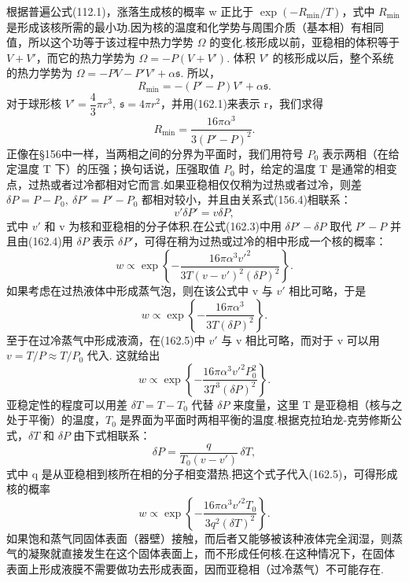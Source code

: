 根据普遍公式(112.1)，涨落生成核的概率 w 正比于 $\exp\left(-R_{\mathrm{min}}/T\right)$，式中 $R_{\mathrm{min}}$ 是形成该核所需的最小功.因为核的温度和化学势与周围介质（基本相）有相同值，所以这个功等于该过程中热力学势 $\Omega$ 的变化.核形成以前，亚稳相的体积等于 $V+V'$，而它的热力学势为 $\Omega=-P(V+V')$. 体积 $V'$ 的核形成以后，整个系统的热力学势为 $\Omega=-PV-P'V'+\alpha\mathfrak{s}$. 所以，
\begin{equation}
  R_{\mathrm{min}}=-(P'-P)V'+\alpha\mathfrak{s}.
\end{equation}
对于球形核 $V'=\dfrac{4}{3}\pi r^3,\ \mathfrak{s}=4\pi r^2$，并用(162.1)来表示 r，我们求得
\begin{equation}
  R_{\mathrm{min}}=\frac{16\pi\alpha^3}{3(P'-P)^2}.
\end{equation}
正像在§156中一样，当两相之间的分界为平面时，我们用符号 $P_0$ 表示两相（在给定温度 T 下）的压强；换句话说，压强取值 $P_0$ 时，给定的温度 T 是通常的相变点，过热或者过冷都相对它而言.如果亚稳相仅仅稍为过热或者过冷，则差 $\delta P=P-P_0,\ \delta P'=P'-P_0$ 都相对较小，并且由关系式(156.4)相联系：
\begin{equation}
  v'\delta P'=v\delta P,
\end{equation}
式中 $v'$ 和 v 为核和亚稳相的分子体积.在公式(162.3)中用 $\delta P'-\delta P$ 取代 $P'-P$ 并且由(162.4)用 $\delta P$ 表示 $\delta P'$，可得在稍为过热或过冷的相中形成一个核的概率：
\begin{equation}
  w\propto\exp\left\{-\frac{16\pi\alpha^3v'^2}
  {3T(v-v')^2(\delta P)^2}\right\}.
\end{equation}
如果考虑在过热液体中形成蒸气泡，则在该公式中 v 与 $v'$ 相比可略，于是
\begin{equation}
  w\propto\exp\left\{-\frac{16\pi\alpha^3}{3T(\delta P)^2}\right\}.
\end{equation}
至于在过冷蒸气中形成液滴，在(162.5)中 $v'$ 与 v 相比可略，而对于 v 可以用 $v=T/P\approx T/P_0$ 代入. 这就给出
\begin{equation}
  w\propto\exp\left\{-\frac{16\pi\alpha^3v'^2P_0^2}
  {3T^3(\delta P)^2}\right\}.
\end{equation}
亚稳定性的程度可以用差 $\delta T=T-T_0$ 代替 $\delta P$ 来度量，这里 T 是亚稳相（核与之处于平衡）的温度，$T_0$ 是界面为平面时两相平衡的温度.根据克拉珀龙-克劳修斯公式，$\delta T$ 和 $\delta P$ 由下式相联系：
\begin{equation*}
  \delta P=\frac{q}{T_0(v-v')}\,\delta T,
\end{equation*}
式中 q 是从亚稳相到核所在相的分子相变潜热.把这个式子代入(162.5)，可得形成核的概率
\begin{equation}
  w\propto\exp\left\{-\frac{16\pi\alpha^3v'^2T_0}
  {3q^2(\delta T)^2}\right\}.
\end{equation}
如果饱和蒸气同固体表面（器壁）接触，而后者又能够被该种液体完全润湿，则蒸气的凝聚就直接发生在这个固体表面上，而不形成任何核.在这种情况下，在固体表面上形成液膜不需要做功去形成表面，因而亚稳相（过冷蒸气）不可能存在.

